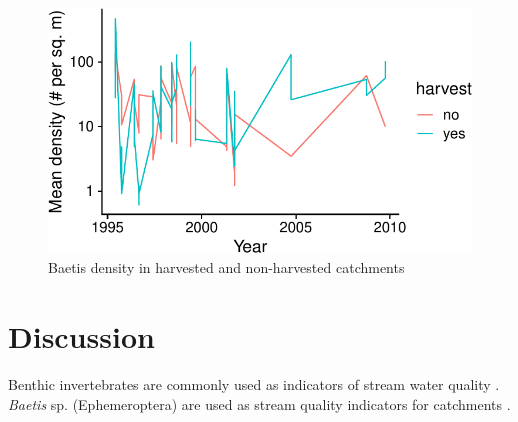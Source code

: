 \documentclass[preprint, 3p,
authoryear]{elsarticle} %
\begin{document}
\begin{figure}[H]

{\centering \includegraphics[width=0.75\linewidth]{Straus_PREE_MockArticle_files/figure-latex/fig1-1} 

}

\caption{\label{fig1}Baetis density in harvested and non-harvested catchments}\label{fig:fig1}
\end{figure}

\hypertarget{discussion}{%
\section{Discussion}\label{discussion}}

Benthic invertebrates are commonly used as indicators of stream water
quality \citep{guilpart2012use}. \emph{Baetis} sp. (Ephemeroptera) are
used as stream quality indicators for catchments
\citep{wallace1986response}.

\renewcommand\refname{References}

\end{document}
